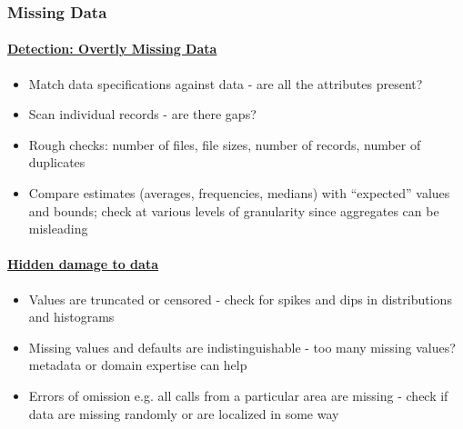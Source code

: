 \documentclass[10pt,a4paper]{article}
\begin{document}
\subsubsection{Missing Data}
\paragraph{\uline{Detection: Overtly Missing Data}}
\begin{itemize}
	\item Match data specifications against data - are all the attributes present?
	\item Scan individual records - are there gaps?
	\item Rough checks: number of files, file sizes, number of
records, number of duplicates
	\item Compare estimates (averages, frequencies, medians) with “expected” values and bounds; check at various levels of granularity since aggregates can be misleading
\end{itemize}
\paragraph{\uline{Hidden damage to data}}
\begin{itemize}
	\item Values are truncated or censored - check for spikes and dips in distributions and histograms
	\item Missing values and defaults are indistinguishable - too many missing values? metadata or domain expertise can help
 	\item Errors of omission e.g. all calls from a particular area are missing - check if data are missing randomly or are localized in some way
\end{itemize}
\end{document}
